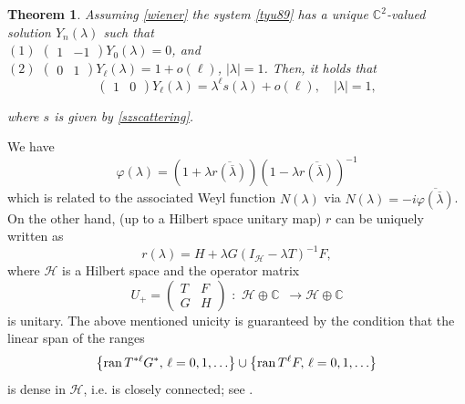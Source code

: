 \documentclass[12pt]{amsart}
\newtheorem{thm}{Theorem}[section]
\theoremstyle{definition}
\theoremstyle{remark}
\numberwithin{equation}{section}
\begin{document}
  \begin{thm}
    Assuming \eqref{wiener} the system \eqref{tyu89} has a unique $\mathbb C^2$-valued solution $Y_n({\lambda})$ such that\\
    $(1)$ $\begin{pmatrix}1&-1\end{pmatrix}Y_0({\lambda})=0$, and\\
    $(2)$ $\begin{pmatrix}0&1\end{pmatrix}Y_\ell({\lambda})=1+o(\ell)$, $|{\lambda}|=1$.
    Then, it holds that
    \[
      \begin{pmatrix}1&0\end{pmatrix}Y_\ell({\lambda})={\lambda}^\ell s({\lambda})+o(\ell),\quad |{\lambda}|=1,
    \]

    where $s$ is given by \eqref{szscattering}.
  \end{thm}





We have
\begin{equation}
  \label{phi789}
\varphi({\lambda})=(1+{\lambda}\overline{r(\overline{{\lambda}})})(1-{\lambda}\overline{r(\overline{{\lambda}})})^{-1}
\end{equation}
which is related to the associated Weyl function $N({\lambda})$ via $N({\lambda})=-i\overline{\varphi(\overline{{\lambda}})}$.\\




On the other hand, (up to a Hilbert space unitary map)  $r$ can be uniquely written as
\begin{equation}
  \label{rz}
r({\lambda})=H+{\lambda}G(I_{\mathcal H}-{\lambda}T)^{-1}F,
\end{equation}
where $\mathcal H$ is a Hilbert space and the operator matrix
\begin{equation}
  \label{u+}
U_+=\begin{pmatrix} T&F\\ G&H\end{pmatrix}\,\, :\,\,\mathcal H\oplus \mathbb C\,\,\,\longrightarrow \mathcal H\oplus \mathbb C
\end{equation}
is unitary. The above mentioned unicity is guaranteed by the condition that the linear span of the ranges
\begin{equation}
  \label{tyu}
\left\{ {\rm ran}\,T^{*\ell}G^*,\, \ell=0,1,\ldots\right\}\cup\left\{ {\rm ran}\, T^{\ell}F,\, \ell=0,1,\ldots\right\}
\end{equation}
is dense in $\mathcal H$, i.e. is closely connected; see \cite{adrs}.\\
\end{document}
